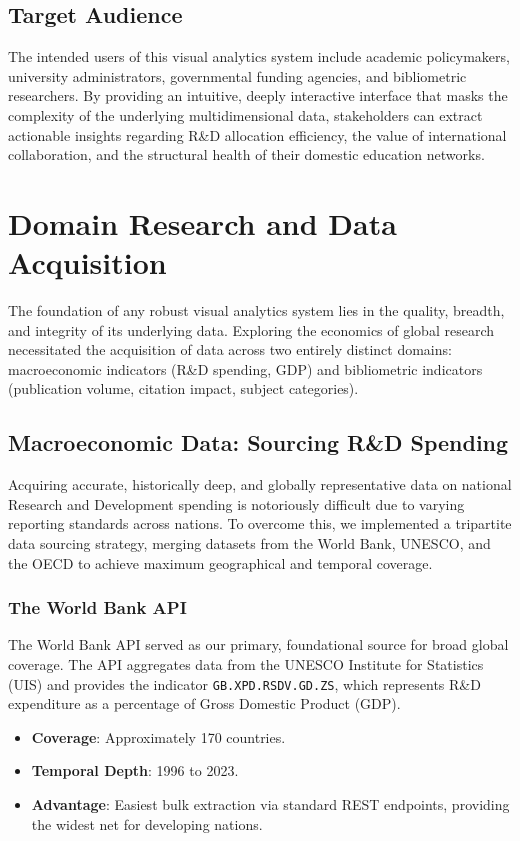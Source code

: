 \documentclass[12pt,a4paper]{article}
\begin{document}
\subsection{Target Audience}
The intended users of this visual analytics system include academic policymakers, university administrators, governmental funding agencies, and bibliometric researchers. By providing an intuitive, deeply interactive interface that masks the complexity of the underlying multidimensional data, stakeholders can extract actionable insights regarding R\&D allocation efficiency, the value of international collaboration, and the structural health of their domestic education networks.

\newpage
\section{Domain Research and Data Acquisition}
The foundation of any robust visual analytics system lies in the quality, breadth, and integrity of its underlying data. Exploring the economics of global research necessitated the acquisition of data across two entirely distinct domains: macroeconomic indicators (R\&D spending, GDP) and bibliometric indicators (publication volume, citation impact, subject categories).

\subsection{Macroeconomic Data: Sourcing R\&D Spending}
Acquiring accurate, historically deep, and globally representative data on national Research and Development spending is notoriously difficult due to varying reporting standards across nations. To overcome this, we implemented a tripartite data sourcing strategy, merging datasets from the World Bank, UNESCO, and the OECD to achieve maximum geographical and temporal coverage.

\subsubsection{The World Bank API}
The World Bank API served as our primary, foundational source for broad global coverage. The API aggregates data from the UNESCO Institute for Statistics (UIS) and provides the indicator \texttt{GB.XPD.RSDV.GD.ZS}, which represents R\&D expenditure as a percentage of Gross Domestic Product (GDP).
\begin{itemize}
    \item \textbf{Coverage}: Approximately 170 countries.
    \item \textbf{Temporal Depth}: 1996 to 2023.
    \item \textbf{Advantage}: Easiest bulk extraction via standard REST endpoints, providing the widest net for developing nations.
\end{itemize}
\end{document}
